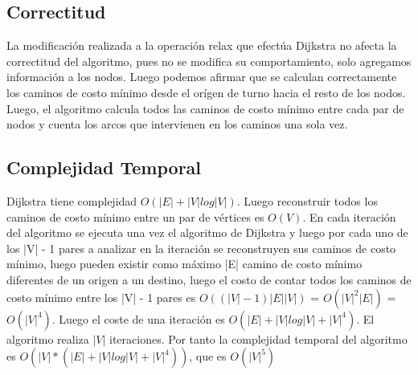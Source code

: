 \documentclass[article]{llncs}
\begin{document}
\subsection{Correctitud}

La modificaci\'on realizada a la operaci\'on relax que efect\'ua Dijkstra no afecta la correctitud 
del algoritmo, pues no se modifica su comportamiento, solo agregamos informaci\'on a los nodos. Luego 
podemos afirmar que se calculan correctamente los caminos de costo m\'inimo desde el or\'igen de turno 
hacia el resto de los nodos. Luego, el algoritmo calcula todos las caminos de costo m\'inimo entre cada 
par de nodos y cuenta los arcos que intervienen en los caminos una sola vez. 

\subsection{Complejidad Temporal}

Dijkstra tiene complejidad $O(|E| + |V|log|V|)$. Luego reconstruir todos los caminos de costo m\'inimo 
entre un par de v\'ertices es $O(V)$. En cada iteraci\'on del algoritmo se ejecuta una vez el algoritmo 
de Dijkstra y luego por cada uno de los |V| - 1 pares a analizar en la iteraci\'on se reconstruyen sus 
caminos de costo m\'inimo, luego pueden existir como m\'aximo |E| camino de costo m\'inimo diferentes 
de un origen a un destino, luego el costo de contar todos los caminos de costo m\'inimo entre los |V| - 1
pares es $O((|V|-1)|E||V|)$ = $O(|V|^2|E|)$ = $O(|V|^4)$. Luego el coste de una iteraci\'on es $O(|E| + |V|log|V| + |V|^4)$. 
El algoritmo realiza $|V|$ iteraciones. Por tanto la complejidad temporal del algoritmo es $O(|V|*(|E| + |V|log|V| + |V|^4))$, 
que es $O(|V|^5)$
\end{document}
